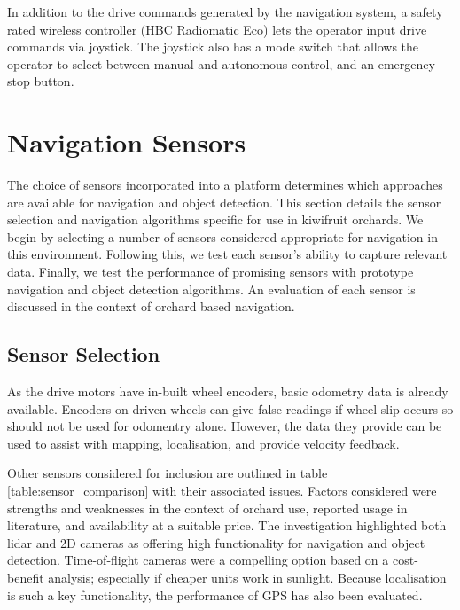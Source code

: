 \documentclass[preprint,authoryear,12pt]{elsarticle}
\begin{document}
        In addition to the drive commands generated by the navigation system, a safety rated wireless controller (HBC Radiomatic Eco) lets the operator input drive commands via joystick.
        The joystick also has a mode switch that allows the operator to select between manual and autonomous control, and an emergency stop button.


\section{Navigation Sensors}
\label{sect:sensors}
    The choice of sensors incorporated into a platform determines which approaches are available for navigation and object detection.
    This section details the sensor selection and navigation algorithms specific for use in kiwifruit orchards.
    We begin by selecting a number of sensors considered appropriate for navigation in this environment.
    Following this, we test each sensor's ability to capture relevant data.
    Finally, we test the performance of promising sensors with prototype navigation and object detection algorithms.
    An evaluation of each sensor is discussed in the context of orchard based navigation.

\subsection{Sensor Selection}

    As the drive motors have in-built wheel encoders, basic odometry data is already available.
    Encoders on driven wheels can give false readings if wheel slip occurs so should not be used for odomentry alone.
    However, the data they provide can be used to assist with mapping, localisation, and provide velocity feedback.

    Other sensors considered for inclusion are outlined in table \ref{table:sensor_comparison} with their associated issues.
    Factors considered were strengths and weaknesses in the context of orchard use, reported usage in literature, and availability at a suitable price.
    The investigation highlighted both lidar and 2D cameras as offering high functionality for navigation and object detection.
    Time-of-flight cameras were a compelling option based on a cost-benefit analysis; especially if cheaper units work in sunlight.
    Because localisation is such a key functionality, the performance of GPS has also been evaluated.
\end{document}

